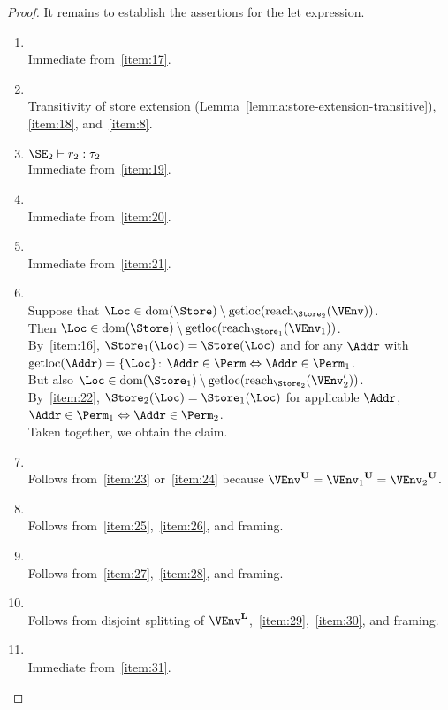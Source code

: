 \begin{proof}
  It remains to establish the assertions for the let expression.
  \begin{enumerate}[({R}-1)]
  \item {}
    \\ Immediate from~\ref{item:17}.
  \item {}
    \\ Transitivity of store extension
    (Lemma~\ref{lemma:store-extension-transitive}), \ref{item:18},
    and~\ref{item:8}.
  \item  $\SE_2 \vdash r_2 : \tau_2$
    \\ Immediate from~\ref{item:19}.
  \item {}
    \\ Immediate from~\ref{item:20}.
  \item {}
    \\ Immediate from~\ref{item:21}.
  \item {}
    ~\\ Suppose that $\Loc \in \Dom\Store \setminus
    \Rawloc{\Reach{\Store_2}{\VEnv}}$.
    \\ Then $\Loc \in \Dom\Store \setminus
    \Rawloc{\Reach{\Store_1}{\VEnv_1}}$.
    \\ By~\ref{item:16}, $\Store_1 (\Loc) = \Store (\Loc)$ and for any
    $\Addr$ with $\Rawloc\Addr = \{\Loc\}$: $\Addr \in \Perm
    \Leftrightarrow \Addr \in \Perm_1$.
    \\ But also $\Loc \in \Dom{\Store_1} \setminus
    \Rawloc{\Reach{\Store_2}{\VEnv_2'}}$.
    \\ By~\ref{item:22}, $\Store_2 (\Loc) = \Store_1 (\Loc)$ for
    applicable $\Addr$, $\Addr \in \Perm_1
    \Leftrightarrow \Addr \in \Perm_2$.
    \\ Taken together, we obtain the claim.
  \item {}
    \\ Follows from~\ref{item:23} or~\ref{item:24} because
    $\ImmutableBorrows\VEnv = \ImmutableBorrows{\VEnv_1} =
    \ImmutableBorrows{\VEnv_2}$.
  \item {}
    \\ Follows from~\ref{item:25},~\ref{item:26}, and framing.
  \item {}
    ~\\ Follows from~\ref{item:27},~\ref{item:28}, and framing.
  \item {}
    \\ Follows from disjoint splitting of
    $\Active\VEnv$,~\ref{item:29},~\ref{item:30}, and framing.
  \item {}
    \\ Immediate from~\ref{item:31}.
  \end{enumerate}


\end{proof}
